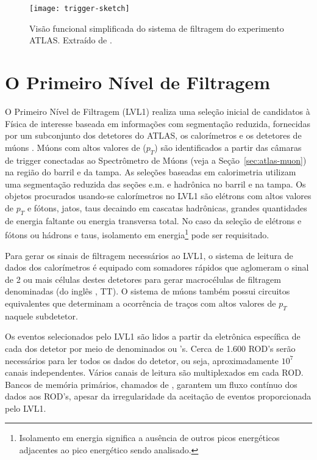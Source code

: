 \begin{figure}
\begin{center}
\texttt{[image: trigger-sketch]}
\end{center}
\caption[Visão funcional simplificada do sistema de filtragem do experimento
ATLAS.]{Visão funcional simplificada do sistema de filtragem do experimento
ATLAS. Extraído de \cite{hlt-tdr}.}
\label{fig:trigger-sketch}
\end{figure}

\section{O Primeiro Nível de Filtragem}
\label{sec:lvl1}

O Primeiro Nível de Filtragem (LVL1) realiza uma seleção inicial de candidatos
à Física de interesse baseada em informações com segmentação reduzida,
fornecidas por um subconjunto dos detetores do ATLAS, os calorímetros e os
detetores de múons \cite{l1-tdr}. Múons com altos valores de  ($p_T$) são identificados a partir das câmaras de trigger
conectadas ao Spectrômetro de Múons (veja a Seção~\ref{sec:atlas-muon}) na
região do barril e da tampa. As seleções baseadas em calorimetria utilizam uma
segmentação reduzida das seções e.m. e hadrônica no barril e na tampa. Os
objetos procurados usando-se calorímetros no LVL1 são elétrons com altos
valores de $p_T$ e fótons, jatos, taus decaindo em cascatas hadrônicas,
grandes quantidades de energia faltante ou energia transversa total. No caso
da seleção de elétrons e fótons ou hádrons e taus, isolamento em
energia\footnote{Isolamento em energia significa a ausência de outros picos
energéticos adjacentes ao pico energético sendo analisado.} pode ser
requisitado.

Para gerar os sinais de filtragem necessários ao LVL1, o sistema de leitura de
dados dos calorímetros é equipado com somadores rápidos \cite{seixas:adder,
lar-tdr} que aglomeram o sinal de 2 ou mais células destes detetores para
gerar macrocélulas de filtragem denominadas  (do
inglês , TT). O sistema de múons também possui
circuitos equivalentes que determinam a ocorrência de traços com altos valores
de $p_T$ naquele subdetetor.

Os eventos selecionados pelo LVL1 são lidos a partir da eletrônica específica
de cada dos detetor por meio de  denominados  ou 's. Cerca de 1.600 ROD's serão necessários para ler todos
os dados do detetor, ou seja, aproximadamente $10^7$ canais
independentes. Vários canais de leitura são multiplexados em cada ROD. Bancos
de memória primários, chamados de , garantem um fluxo
contínuo dos dados aos ROD's, apesar da irregularidade da aceitação de eventos
proporcionada pelo LVL1.

